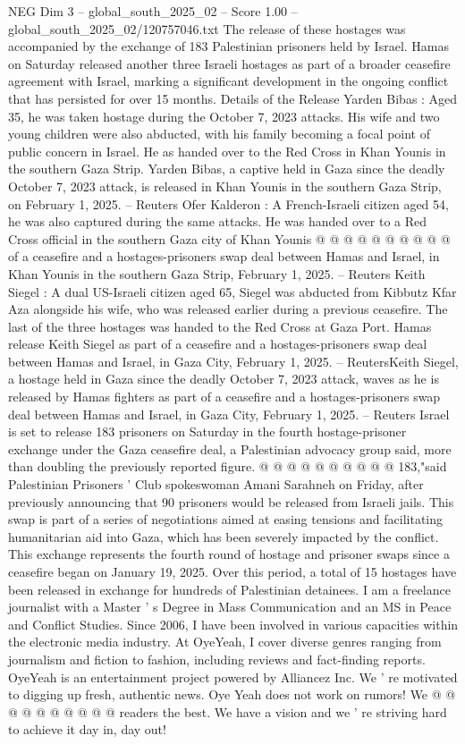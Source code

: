 \begin{textsample}{NEG Dim 3 – global\_south\_2025\_02 – Score 1.00 – global\_south\_2025\_02/120757046.txt}  \label{ex:f3_neg_045}
The release of these hostages was accompanied by the exchange of 183 Palestinian prisoners held by Israel.
Hamas on Saturday released another three Israeli hostages as part of a broader ceasefire agreement with Israel, marking a significant development in the ongoing conflict that has persisted for over 15 months.
Details of the Release Yarden Bibas : Aged 35, he was taken hostage during the October 7, 2023 attacks.
His wife and two young children were also abducted, with his family becoming a focal point of public concern in Israel.
He as handed over to the Red Cross in Khan Younis in the southern Gaza Strip.
Yarden Bibas, a captive held in Gaza since the deadly October 7, 2023 attack, is released in Khan Younis in the southern Gaza Strip, on February 1, 2025. -- Reuters Ofer Kalderon : A French-Israeli citizen aged 54, he was also captured during the same attacks.
He was handed over to a Red Cross official in the southern Gaza city of Khan Younis @ @ @ @ @ @ @ @ @ @ of a ceasefire and a hostages-prisoners swap deal between Hamas and Israel, in Khan Younis in the southern Gaza Strip, February 1, 2025. -- Reuters Keith Siegel : A dual US-Israeli citizen aged 65, Siegel was abducted from Kibbutz Kfar Aza alongside his wife, who was released earlier during a previous ceasefire.
The last of the three hostages was handed to the Red Cross at Gaza Port.
Hamas release Keith Siegel as part of a ceasefire and a hostages-prisoners swap deal between Hamas and Israel, in Gaza City, February 1, 2025. -- ReutersKeith Siegel, a hostage held in Gaza since the deadly October 7, 2023 attack, waves as he is released by Hamas fighters as part of a ceasefire and a hostages-prisoners swap deal between Hamas and Israel, in Gaza City, February 1, 2025. -- Reuters Israel is set to release 183 prisoners on Saturday in the fourth hostage-prisoner exchange under the Gaza ceasefire deal, a Palestinian advocacy group said, more than doubling the previously reported figure. @ @ @ @ @ @ @ @ @ @ 183,"said Palestinian Prisoners ' Club spokeswoman Amani Sarahneh on Friday, after previously announcing that 90 prisoners would be released from Israeli jails.
This swap is part of a series of negotiations aimed at easing tensions and facilitating humanitarian aid into Gaza, which has been severely impacted by the conflict.
This exchange represents the fourth round of hostage and prisoner swaps since a ceasefire began on January 19, 2025.
Over this period, a total of 15 hostages have been released in exchange for hundreds of Palestinian detainees.
I am a freelance journalist with a Master ' s Degree in Mass Communication and an MS in Peace and Conflict Studies.
Since 2006, I have been involved in various capacities within the electronic media industry.
At OyeYeah, I cover diverse genres ranging from journalism and fiction to fashion, including reviews and fact-finding reports.
OyeYeah is an entertainment project powered by Alliancez Inc.
We ' re motivated to digging up fresh, authentic news.
Oye Yeah does not work on rumors!
We @ @ @ @ @ @ @ @ @ @ readers the best.
We have a vision and we ' re striving hard to achieve it day in, day out!

\end{textsample}
